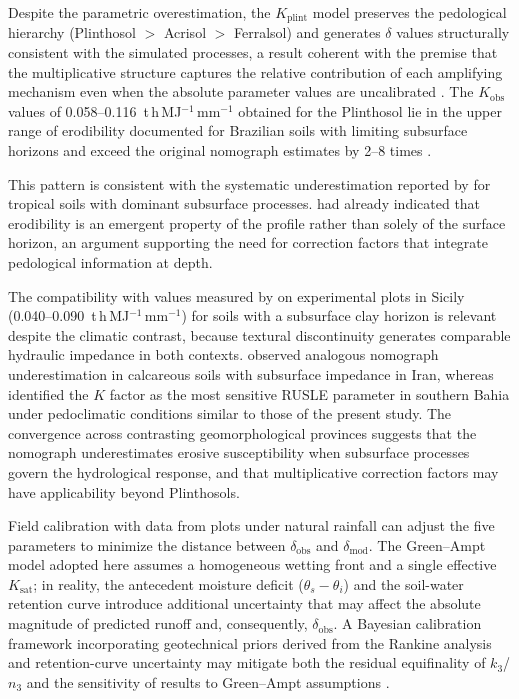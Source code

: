 \documentclass[preprint,review,12pt,authoryear]{elsarticle}
\begin{document}
Despite the parametric overestimation, the $K_{\mathrm{plint}}$ model preserves the pedological hierarchy (Plinthosol $>$ Acrisol $>$ Ferralsol) and generates $\delta$ values structurally consistent with the simulated processes, a result coherent with the premise that the multiplicative structure captures the relative contribution of each amplifying mechanism even when the absolute parameter values are uncalibrated \citep{renard_et_al_1997}. The $K_{\mathrm{obs}}$ values of 0.058--0.116~t\,h\,MJ$^{-1}$\,mm$^{-1}$ obtained for the Plinthosol lie in the upper range of erodibility documented for Brazilian soils with limiting subsurface horizons \citep{lafayette_cantalice_coutinho_2011,cassol_et_al_2023} and exceed the original nomograph estimates by 2--8 times \citep{wischmeier_et_al_1971}.

This pattern is consistent with the systematic underestimation reported by \citet{alewell_et_al_2019} for tropical soils with dominant subsurface processes. \citet{torri_poesen_2014} had already indicated that erodibility is an emergent property of the profile rather than solely of the surface horizon, an argument supporting the need for correction factors that integrate pedological information at depth.

The compatibility with values measured by \citet{bagarello_et_al_2012} on experimental plots in Sicily (0.040--0.090~t\,h\,MJ$^{-1}$\,mm$^{-1}$) for soils with a subsurface clay horizon is relevant despite the climatic contrast, because textural discontinuity generates comparable hydraulic impedance in both contexts. \citet{ostovari_et_al_2016} observed analogous nomograph underestimation in calcareous soils with subsurface impedance in Iran, whereas \citet{francois_et_al_2024} identified the $K$ factor as the most sensitive RUSLE parameter in southern Bahia under pedoclimatic conditions similar to those of the present study. The convergence across contrasting geomorphological provinces suggests that the nomograph underestimates erosive susceptibility when subsurface processes govern the hydrological response, and that multiplicative correction factors may have applicability beyond Plinthosols.

Field calibration with data from plots under natural rainfall can adjust the five parameters to minimize the distance between $\delta_{\mathrm{obs}}$ and $\delta_{\mathrm{mod}}$. The Green--Ampt model adopted here assumes a homogeneous wetting front and a single effective $K_{\mathrm{sat}}$; in reality, the antecedent moisture deficit ($\theta_s - \theta_i$) and the soil-water retention curve introduce additional uncertainty that may affect the absolute magnitude of predicted runoff and, consequently, $\delta_{\mathrm{obs}}$. A Bayesian calibration framework incorporating geotechnical priors derived from the Rankine analysis and retention-curve uncertainty may mitigate both the residual equifinality of $k_3$/$n_3$ and the sensitivity of results to Green--Ampt assumptions \citep{beven_freer_2001}.
\end{document}
